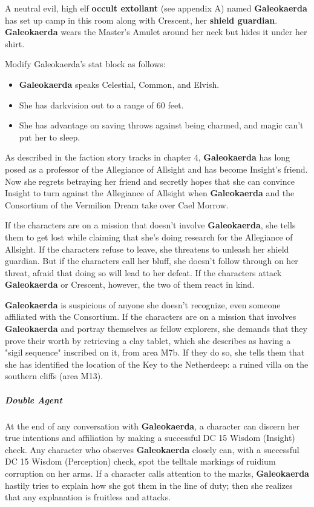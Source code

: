 \documentclass[10pt,a4paper,twoside,fancy,bg=print,twocolumn,openany,nodeprecatedcode]{dndbook}
\begin{document}
A neutral evil, high elf \textbf{occult extollant} (see appendix A) named \textbf{Galeokaerda} has set up camp in this room along with Crescent, her \textbf{shield guardian}. \textbf{Galeokaerda} wears the Master's Amulet around her neck but hides it under her shirt.

Modify Galeokaerda's stat block as follows:


\begin{itemize}
\item \textbf{Galeokaerda} speaks Celestial, Common, and Elvish.
\item She has darkvision out to a range of 60 feet.
\item She has advantage on saving throws against being charmed, and magic can't put her to sleep.
\end{itemize}

As described in the faction story tracks in chapter 4, \textbf{Galeokaerda} has long posed as a professor of the Allegiance of Allsight and has become Insight's friend. Now she regrets betraying her friend and secretly hopes that she can convince Insight to turn against the Allegiance of Allsight when \textbf{Galeokaerda} and the Consortium of the Vermilion Dream take over Cael Morrow.

If the characters are on a mission that doesn't involve \textbf{Galeokaerda}, she tells them to get lost while claiming that she's doing research for the Allegiance of Allsight. If the characters refuse to leave, she threatens to unleash her shield guardian. But if the characters call her bluff, she doesn't follow through on her threat, afraid that doing so will lead to her defeat. If the characters attack \textbf{Galeokaerda} or Crescent, however, the two of them react in kind.

\textbf{Galeokaerda} is suspicious of anyone she doesn't recognize, even someone affiliated with the Consortium. If the characters are on a mission that involves \textbf{Galeokaerda} and portray themselves as fellow explorers, she demands that they prove their worth by retrieving a clay tablet, which she describes as having a "sigil sequence" inscribed on it, from area M7b. If they do so, she tells them that she has identified the location of the Key to the Netherdeep: a ruined villa on the southern cliffs (area M13).

\subparagraph{Double Agent}
At the end of any conversation with \textbf{Galeokaerda}, a character can discern her true intentions and affiliation by making a successful DC 15 Wisdom (Insight) check. Any character who observes \textbf{Galeokaerda} closely can, with a successful DC 15 Wisdom (Perception) check, spot the telltale markings of ruidium corruption on her arms. If a character calls attention to the marks, \textbf{Galeokaerda} hastily tries to explain how she got them in the line of duty; then she realizes that any explanation is fruitless and attacks.
\end{document}
